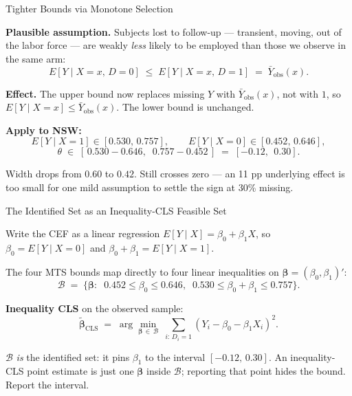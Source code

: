 \documentclass[handout, aspectratio=169]{beamer}
\numberwithin{equation}{section}
\begin{document}
\begin{frame}{Tighter Bounds via Monotone Selection}

\textbf{Plausible assumption.} Subjects lost to follow-up — transient, moving, out of the labor force — are weakly \emph{less} likely to be employed than those we observe in the same arm:
$$E[Y \mid X = x,\, D = 0] \;\leq\; E[Y \mid X = x,\, D = 1] \;=\; \bar{Y}_{\text{obs}}(x).$$

\pause
\smallskip

\textbf{Effect.} The upper bound now replaces missing $Y$ with $\bar{Y}_{\text{obs}}(x)$, not with $1$, so $E[Y\mid X{=}x] \leq \bar{Y}_{\text{obs}}(x)$.  The lower bound is unchanged.

\pause
\smallskip

\textbf{Apply to NSW:}
$$E[Y\mid X{=}1] \in [0.530,\, 0.757], \qquad E[Y\mid X{=}0] \in [0.452,\, 0.646],$$
$$\theta \;\in\; [\,0.530 - 0.646,\;\; 0.757 - 0.452\,] \;=\; [-0.12,\;\, 0.30].$$

\pause
\smallskip

Width drops from $0.60$ to $0.42$.  Still crosses zero — an 11 pp underlying effect is too small for one mild assumption to settle the sign at 30\% missing.
\end{frame}

\begin{frame}{The Identified Set as an Inequality-CLS Feasible Set}

Write the CEF as a linear regression $E[Y \mid X] = \beta_0 + \beta_1 X$, so $\beta_0 = E[Y\mid X{=}0]$ and $\beta_0 + \beta_1 = E[Y\mid X{=}1]$.

\pause
\smallskip

The four MTS bounds map directly to four linear inequalities on $\bm{\beta} = (\beta_0, \beta_1)'$:
$$\mathcal{B} \;=\; \bigl\{\bm{\beta}:\;\; 0.452 \le \beta_0 \le 0.646,\;\; 0.530 \le \beta_0 + \beta_1 \le 0.757\bigr\}.$$

\pause
\smallskip

\textbf{Inequality CLS} on the observed sample:
$$\tilde{\bm{\beta}}_{\text{CLS}} \;=\; \arg\min_{\bm{\beta}\,\in\,\mathcal{B}} \;\sum_{i:\,D_i=1} (Y_i - \beta_0 - \beta_1 X_i)^2.$$

\pause
\smallskip

\begin{tcolorbox}[colback=blue!5, colframe=blue!50]
$\mathcal{B}$ \emph{is} the identified set: it pins $\beta_1$ to the interval $[-0.12,\, 0.30]$.  An inequality-CLS point estimate is just one $\bm{\beta}$ inside $\mathcal{B}$; reporting that point hides the bound.  Report the interval.
\end{tcolorbox}
\end{frame}
\end{document}

